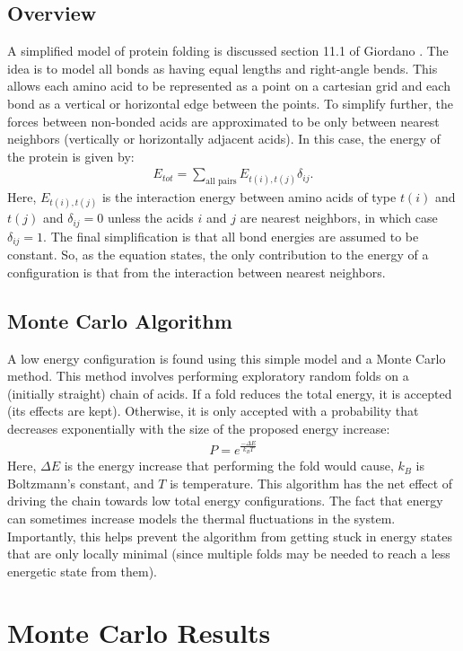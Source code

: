 \documentclass[12pt]{article}
\begin{document}
\subsection{Overview}
A simplified model of protein folding is discussed section 11.1 of Giordano \cite{giordano}. The idea is to model all bonds as having equal lengths and right-angle bends. This allows each amino acid to be represented as a point on a cartesian grid and each bond as a vertical or horizontal edge between the points. To simplify further, the forces between non-bonded acids are approximated to be only between nearest neighbors (vertically or horizontally adjacent acids). In this case, the energy of the protein is given by:
\begin{align*}
E_{tot} = \sum_{\text{all pairs}} E_{t(i), t(j)} \delta_{ij}.
\end{align*}
Here, $E_{t(i), t(j)}$ is the interaction energy between amino acids of type $t(i)$ and $t(j)$ and $\delta_{ij} = 0$ unless the acids $i$ and $j$ are nearest neighbors, in which case $\delta_{ij} = 1$. The final simplification is that all bond energies are assumed to be constant. So, as the equation states, the only contribution to the energy of a configuration is that from the interaction between nearest neighbors.
\subsection{Monte Carlo Algorithm}
A low energy configuration is found using this simple model and a Monte Carlo method. This method involves performing exploratory random folds on a (initially straight) chain of acids. If a fold reduces the total energy, it is accepted (its effects are kept). Otherwise, it is only accepted with a probability that decreases exponentially with the size of the proposed energy increase:
\begin{align*}
P = e^{\frac{- \Delta E}{k_B T}}
\end{align*}
Here, $\Delta E$ is the energy increase that performing the fold would cause, $k_B$ is Boltzmann's constant, and $T$ is temperature.
This algorithm has the net effect of driving the chain towards low total energy configurations. The fact that energy can sometimes increase models the thermal fluctuations in the system. Importantly, this helps prevent the algorithm from getting stuck in energy states that are only locally minimal (since multiple folds may be needed to reach a less energetic state from them).
\section{Monte Carlo Results}
\end{document}
